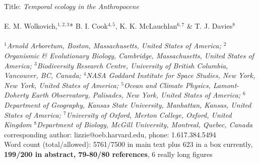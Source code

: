 \documentclass[11pt,a4paper,oneside]{article}
\begin{document}


\noindent Title: \emph{Temporal ecology in the Anthropocene}\\
\\
\noindent E. M. Wolkovich,$^{1,2,3}$* B. I. Cook$^{4,5}$, K. K. McLauchlan$^{6,7}$ \& T. J. Davies$^{8}$\\
\\
\noindent \emph{$^{1}$Arnold Arboretum, Boston, Massachusetts, United States of America; $^{2}$Organismic \& Evolutionary Biology, Cambridge, Massachusetts, United States of America; $^{3}$Biodiversity Research Centre, University of British Columbia, Vancouver, BC, Canada; $^{4}$NASA Goddard Institute for Space Studies, New York, New York, United States of America; $^{5}$Ocean and Climate  Physics, Lamont-Doherty Earth Observatory, Palisades, New York, United States of America; $^{6}$Department of Geography, Kansas State University, Manhattan, Kansas, United States of America; $^{7}$University of Oxford, Merton College, Oxford, United Kingdom $^{8}$Department of Biology, McGill University, Montreal, Quebec, Canada}\\ %

\noindent *corresponding author: lizzie@oeb.harvard.edu, phone: 1.617.384.5494\\

\noindent Word count (total/allowed): 5761/7500 in main text plus 623 in a box currently, {\bf 199/200 in abstract, 79-80/80 references}, 6 really long figures %

\end{document}
